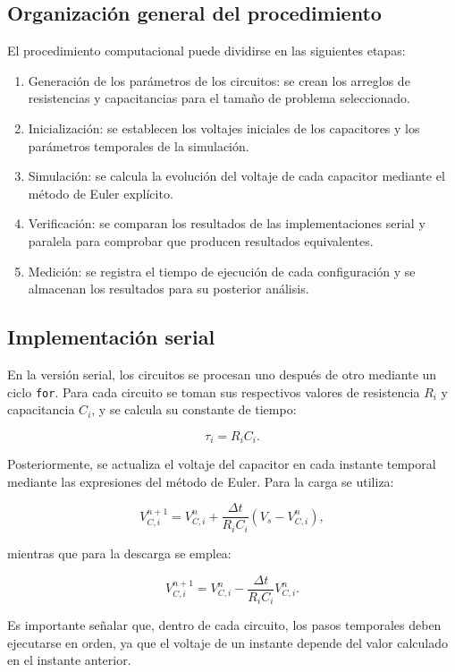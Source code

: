 \documentclass[11pt,a4paper]{article}
\begin{document}
\subsection{Organización general del procedimiento}

El procedimiento computacional puede dividirse en las siguientes etapas:

\begin{enumerate}[leftmargin=*]
    \item Generación de los parámetros de los circuitos: se crean los arreglos de resistencias y capacitancias para el tamaño de problema seleccionado.
    \item Inicialización: se establecen los voltajes iniciales de los capacitores y los parámetros temporales de la simulación.
    \item Simulación: se calcula la evolución del voltaje de cada capacitor mediante el método de Euler explícito.
    \item Verificación: se comparan los resultados de las implementaciones serial y paralela para comprobar que producen resultados equivalentes.
    \item Medición: se registra el tiempo de ejecución de cada configuración y se almacenan los resultados para su posterior análisis.
\end{enumerate}

\subsection{Implementación serial}

En la versión serial, los circuitos se procesan uno después de otro mediante un ciclo \texttt{for}. Para cada circuito se toman sus respectivos valores de resistencia $R_i$ y capacitancia $C_i$, y se calcula su constante de tiempo:

\[
\tau_i=R_iC_i.
\]

Posteriormente, se actualiza el voltaje del capacitor en cada instante temporal mediante las expresiones del método de Euler. Para la carga se utiliza:

\[
V_{C,i}^{n+1}=V_{C,i}^{n}
+\frac{\Delta t}{R_iC_i}
\left(V_s-V_{C,i}^{n}\right),
\]

mientras que para la descarga se emplea:

\[
V_{C,i}^{n+1}=V_{C,i}^{n}
-\frac{\Delta t}{R_iC_i}V_{C,i}^{n}.
\]

Es importante señalar que, dentro de cada circuito, los pasos temporales deben ejecutarse en orden, ya que el voltaje de un instante depende del valor calculado en el instante anterior.
\end{document}
